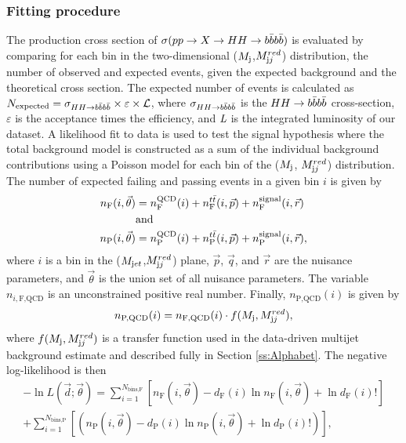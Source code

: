 \subsubsection{Fitting procedure\label{Fitting}}
The production cross section of $\sigma(pp \to X \to HH \to b \bar{b} b \bar{b})$ is evaluated by
comparing for each bin in the two-dimensional ($M_{\textrm j}$,$M_{\textrm jj}^{red}$) distribution, the number of
observed and expected events, given the expected background and the theoretical cross section. The expected number of events is calculated as
$N_{\textrm{expected}} = \sigma_{HH \to b \bar{b} b \bar{b}} \times \varepsilon \times \mathcal{L}$, where $\sigma_{HH \to b \bar{b} b \bar{b}}$ is the $HH \to b \bar{b} b \bar{b}$ cross-section, $\varepsilon$ is the acceptance times the efficiency, and $\emph{L}$ is the integrated luminosity of our dataset. A likelihood fit to data is used to test the signal hypothesis where the total background model is constructed as a sum of the individual background contributions using a Poisson model for each bin of the ($M_{\textrm j}$, $M_{\textrm jj}^{red}$) distribution. The number of expected failing and passing events in a given bin $i$ is given by
\begin{align}
n_{\text{F}}(i,\vec{\theta}) &= n_{\text{F}}^{\text{QCD}}(i) + n_{\text{F}}^{t\bar{t} }(i,\vec{p}) + n_{\text{F}}^{\text{signal}}(i,\vec{r})\\
& \nonumber \text{and} \\
n_{\text{P}}(i,\vec{\theta}) &= n_{\text{P}}^{\text{QCD}}(i) + n_{\text{P}}^{t\bar{t} }(i,\vec{p}) + n_{\text{P}}^{\text{signal}}(i,\vec{r}),
\end{align}
where $i$ is a bin in the ($M_{\textrm jet}$,$M_{\textrm jj}^{red}$) plane, $\vec{p}$, $\vec{q}$, and $\vec{r}$ are the nuisance parameters, and $\vec{\theta}$ is the union set of all nuisance parameters. The variable $n_{i,\text{F,QCD}}$ is an unconstrained positive real number. Finally, $n_{\text{P,QCD}}(i)$ is given by
\begin{equation}
    n_{\text{P,QCD}}(i) = n_{\text{F,QCD}}(i) \cdot f(\mjred,\mred),%
    \label{eq:passDef2}
\end{equation}
where $f(M_{\textrm j},M_{\textrm jj}^{red})$ is a transfer function used in the data-driven multijet background estimate and described fully in Section \ref{ss:Alphabet}. The negative log-likelihood is then
\begin{equation}\label{eq:nLL}
\begin{split}
-\ln L(\vec{d};\vec{\theta}) =
    \sum_{i=1}^{N_{\text{bins,F}}} \left[n_{\text{F}}(i,\vec{\theta}) - d_{\text{F}}(i) \ln n_{\text{F}}(i,\vec{\theta}) + \ln d_{\text{F}}(i) ! \right]\\
    + \sum_{i=1}^{N_{\text{bins,P}}} \left[(n_{\text{P}}(i,\vec{\theta}) - d_{\text{P}}(i) \ln n_{\text{P}}(i,\vec{\theta}) + \ln d_{\text{P}}(i) !)\right],
\end{split}
\end{equation}
